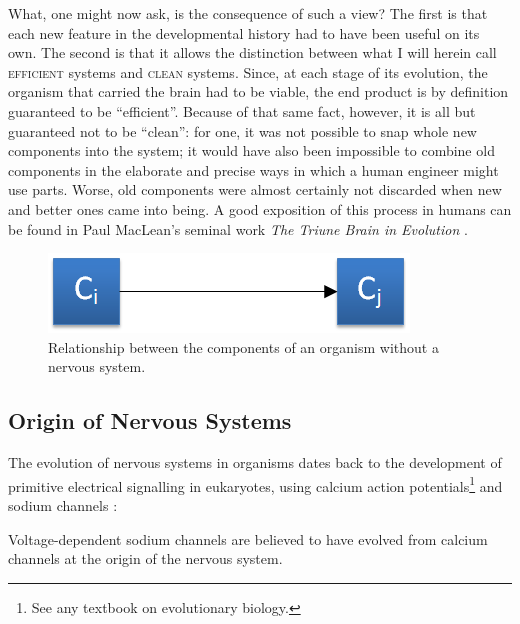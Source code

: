 What, one might now ask, is the consequence of such a view? The first is that each new feature in the developmental history had to have been useful on its own. The second is that it allows the distinction between what I will herein call \textsc{efficient} systems and \textsc{clean} systems. Since, at each stage of its evolution, the organism that carried the brain had to be viable, the end product is by definition guaranteed to be ``efficient''. Because of that same fact, however, it is all but guaranteed not to be ``clean'': for one, it was not possible to snap whole new components into the system; it would have also been impossible to combine old components in the elaborate and precise ways in which a human engineer might use parts. Worse, old components were almost certainly not discarded when new and better ones came into being. A good exposition of this process in humans can be found in Paul MacLean's seminal work {\em The Triune Brain in Evolution} \cite{maclean1990}.

\begin{figure}[!h]
	\centering
	\includegraphics{Figs/noNervousSystem.png}
	\caption{Relationship between the components of an organism without a nervous system.}
	\label{fig:noNervousSystem}
\end{figure}
\subsection{Origin of Nervous Systems} The evolution of nervous systems in organisms dates back to the development of primitive electrical signalling in eukaryotes, using calcium action potentials\footnote{See any textbook on evolutionary biology.} and sodium channels \cite{Liebeskind31052011}:

\begin{emquote}
	Voltage-dependent sodium channels are believed to have evolved from calcium channels at the origin of the nervous system.
\end{emquote}

